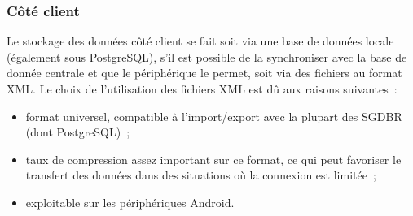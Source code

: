 \subsubsection{Côté client}
Le stockage des données côté client se fait soit via une base de données locale (également sous PostgreSQL), s'il est possible de la synchroniser avec la base de donnée centrale et que le périphérique le permet, soit via des fichiers au format XML.
Le choix de l'utilisation des fichiers XML est dû aux raisons suivantes~:
\begin{itemize}
	\item format universel, compatible à l'import/export avec la plupart des SGDBR (dont PostgreSQL)~;
	\item taux de compression assez important sur ce format, ce qui peut favoriser le transfert des données dans des situations où la connexion est limitée~;
	\item exploitable sur les périphériques Android.
\end{itemize}

